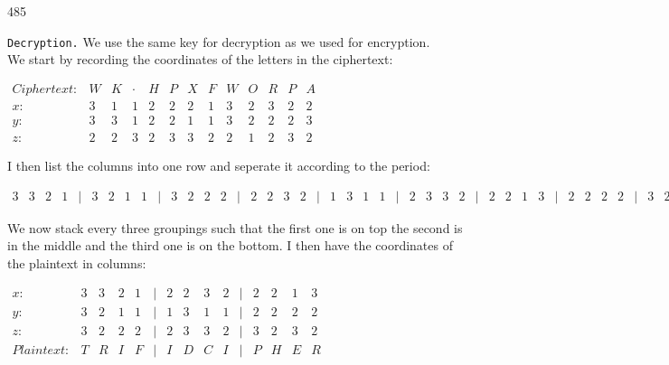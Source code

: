 \documentclass{beamer}%
\begin{document}
\begin{textblock}{485}
	\begin{block}{\texttt{Decryption.}}
		We use the same key for decryption as we used for encryption.\\
		We start by recording the coordinates of the letters in the ciphertext:
		\begin{center}
			$\begin{array}{lcccccccccccc}
			Ciphertext: & W & K & \cdot & H & P & X & F & W & O & R & P & A\\
			x: & 3 & 1 & 1 & 2 & 2 & 2 & 1 & 3 & 2 & 3 & 2 & 2 \\ 
			y: & 3 & 3 & 1 & 2 & 2 & 1 & 1 & 3 & 2 & 2 & 2 & 3 \\ 
			z: & 2 & 2 & 3 & 2 & 3 & 3 & 2 & 2 & 1 & 2 & 3 & 2 
			\end{array}$
		\end{center}
		I then list the columns into one row and seperate it according to the period:
		\begin{center}
			$\begin{array}{cccccccccccccccccccccccccccccccccccccccccccc}
			3 & 3 & 2 & 1 &\mid& 3 & 2 & 1 & 1 &\mid& 3 & 2 & 2 & 2 & \mid & 2 & 2 & 3 & 2 &\mid& 1 & 3 & 1 & 1 &\mid& 2 & 3 & 3 & 2 & \mid & 2 & 2 & 1 & 3 &\mid& 2 & 2 & 2 & 2 &\mid& 3 & 2 & 3 & 2
			\end{array} $
		\end{center}
		We now stack every three groupings such that the first one is on top the second is in the middle and the third one is on the bottom. I then have the coordinates of the plaintext in columns:
		\begin{center}
			$\begin{array}{lcccccccccccccc}
			x: & 3 & 3 & 2 & 1 & \mid & 2 & 2 & 3 & 2 & \mid & 2 & 2 & 1 & 3 \\ 
			y: & 3 & 2 & 1 & 1 & \mid & 1 & 3 & 1 & 1 & \mid & 2 & 2 & 2 & 2 \\ 
			z: & 3 & 2 & 2 & 2 & \mid & 2 & 3 & 3 & 2 & \mid & 3 & 2 & 3 & 2 \\
			Plaintext: & T & R & I & F&\mid & I & D & C & I &\mid & P & H & E & R 
			\end{array} $
		\end{center}
		
	\end{block}
	
	\end{textblock}
\end{document}
